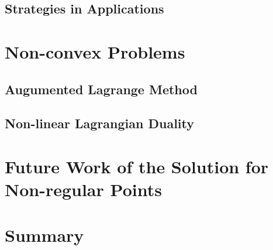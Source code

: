 \subsection{Strategies in Applications}

\section{Non-convex Problems}
\subsection{Augumented Lagrange Method}
\subsection{Non-linear Lagrangian Duality}



\section{Future Work of the Solution for Non-regular Points}


\section{Summary}
